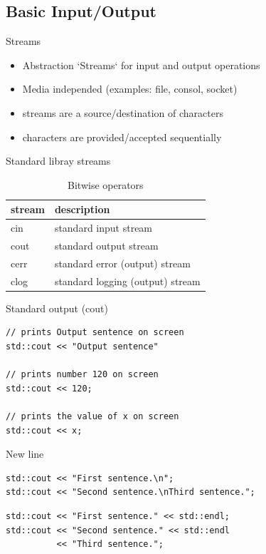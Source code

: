 \documentclass{beamer}
\begin{document}
\subsection{Basic Input/Output}

\begin{frame}{Streams}
\begin{itemize}
\item Abstraction `Streams` for input and output operations
\item Media independed (examples: file, consol, socket)
\item streams are a source/destination of characters
\item characters are provided/accepted sequentially
\end{itemize}
\end{frame}

\begin{frame}{Standard libray streams}
\begin{table}
\begin{tabular}{l | l}
stream & description \\
\hline
cin & standard input stream \\
cout & standard output stream \\
cerr & standard error (output) stream \\
clog & standard logging (output) stream \\
\end{tabular}
\caption{Bitwise operators}
\end{table}
\end{frame}

\begin{frame}[fragile]{Standard output (cout)}
\begin{lstlisting}[caption=Standard output]
// prints Output sentence on screen
std::cout << "Output sentence" 

// prints number 120 on screen
std::cout << 120;

// prints the value of x on screen
std::cout << x;
\end{lstlisting}
\end{frame}

\begin{frame}[fragile]{New line}
\begin{lstlisting}[caption=Use ASCII newline character]
std::cout << "First sentence.\n";
std::cout << "Second sentence.\nThird sentence.";
\end{lstlisting}

\begin{lstlisting}[caption=Use portable endl]
std::cout << "First sentence." << std::endl;
std::cout << "Second sentence." << std::endl
          << "Third sentence.";
\end{lstlisting}
\end{frame}
\end{document}

